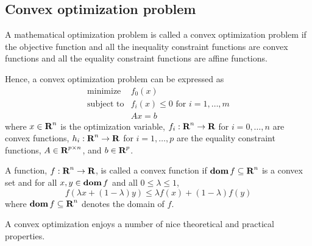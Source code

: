 \documentclass[11pt, oneside]{article}   	%
\begin{document}
\subsection{Convex optimization problem}

A mathematical optimization problem is called a convex optimization problem
if the objective function and all the inequality constraint functions are convex functions
and all the equality constraint functions are affine functions.

Hence, a convex optimization problem can be expressed as
\begin{equation}
\label{eq:cvx-opt-prob}
\begin{array}{ll}
\mbox{minimize} & f_0(x)
\\
\mbox{subject to} & f_i(x) \leq 0 \mbox{ for } i = 1, \ldots, m
\\
& A x = b
\end{array}
\end{equation}
where
$x\in{\mbox{\bf R}}^n$ is the optimization variable,
$f_i:{\mbox{\bf R}}^n\to{\mbox{\bf R}}$ for $i=0,\ldots,n$ are convex functions,
$h_i:{\mbox{\bf R}}^n\to{\mbox{\bf R}}$ for $i=1,\ldots,p$ are the equality constraint functions,
$A \in {\mbox{\bf R}}^{p\times n}$, and $b\in{\mbox{\bf R}}^p$.

A function, $f:{\mbox{\bf R}}^n \to {\mbox{\bf R}}$, is called a convex function if
$\mathop{\bf dom} f \subseteq {\mbox{\bf R}}^n$ is a convex set
and
for all $x, y\in\mathop{\bf dom} f$
and all $0\leq \lambda \leq 1$,
\begin{equation}
    f( \lambda x + (1-\lambda) y) \leq
    \lambda f(x) + (1-\lambda) f(y)
\end{equation}
where $\mathop{\bf dom} f \subseteq {\mbox{\bf R}}^n$ denotes the domain of $f$.

A convex optimization enjoys a number of nice theoretical and practical properties.
\end{document}
